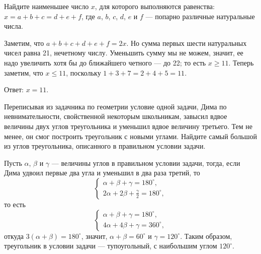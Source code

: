 
\begin{itemize}
\itC Найдите наименьшее число $x$, для которого выполняются равенства:
$x = a+b+c = d+e+f$, где $a$, $b$, $c$, $d$, $e$ и $f$ --- попарно различные натуральные числа.

\itr Заметим, что $a+b+c+d+e+f=2x$. Но сумма первых шести натуральных чисел равна 21, нечетному числу.
Уменьшить сумму мы не можем, значит, ее надо увеличить хотя бы до ближайшего четного --- до 22; 
то есть $x \ge 11$. Теперь заметим, что $x \le 11$, поскольку
$1 + 3 +7 = 2 + 4 + 5 = 11$.

Ответ: $x=11$.
\end{itemize}

\begin{itemize}
\itB Переписывая из задачника по геометрии условие одной задачи, Дима по невнимательности, 
свойственной некоторым школьникам, завысил вдвое величины двух углов треугольника и уменьшил 
вдвое величину третьего. Тем не менее, он смог построить треугольник с новыми углами. Найдите 
самый большой из углов треугольника, описанного в правильном условии задачи.

\itr
 Пусть $\alpha$, $\beta$ и $\gamma$ --- величины углов в правильном условии задачи, тогда, если 
Дима удвоил первые два угла и уменьшил в два раза третий, то
$$
\begin{cases}
\alpha+\beta+\gamma=180^{\circ},\\
2\alpha+2\beta+\frac{\gamma}{2}=180^{\circ},
\end{cases}
$$
то есть
$$
\begin{cases}
\alpha+\beta+\gamma=180^{\circ},\\
4\alpha+4\beta+\gamma=360^{\circ},
\end{cases}
$$
откуда $3(\alpha+\beta)=180^{\circ}$, значит, $\alpha+\beta=60^\circ$ и $\gamma=120^{\circ}$.
Таким образом, треугольник в условии задачи --- тупоугольный, с наибольшим углом 
$120^{\circ}$.

\end{itemize}

